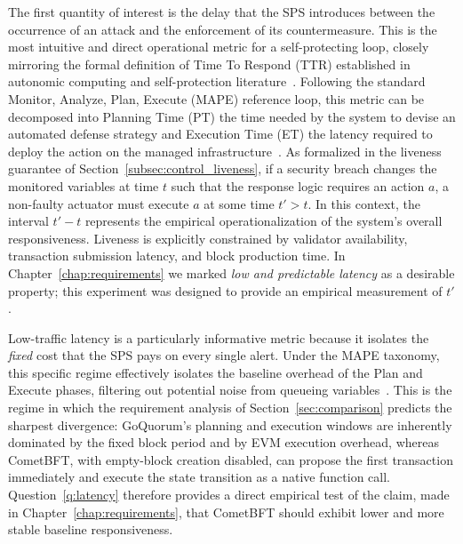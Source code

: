 The first quantity of interest is the delay that the SPS introduces between the occurrence of an attack and the enforcement of its countermeasure. This is the most intuitive and direct operational metric for a self-protecting loop, closely mirroring the formal definition of Time To Respond (TTR) established in autonomic computing and self-protection literature~\cite{montemaggio2020designing}. Following the standard Monitor, Analyze, Plan, Execute (MAPE) reference loop, this metric can be decomposed into Planning Time (PT) the time needed by the system to devise an automated defense strategy and Execution Time (ET) the latency required to deploy the action on the managed infrastructure~\cite{montemaggio2020designing}. As formalized in the liveness guarantee of Section~\ref{subsec:control_liveness}, if a security breach changes the monitored variables at time $t$ such that the response logic requires an action $a$, a non-faulty actuator must execute $a$ at some time $t' > t$. In this context, the interval $t' - t$ represents the empirical operationalization of the system's overall responsiveness. Liveness is explicitly constrained by validator availability, transaction submission latency, and block production time. In Chapter~\ref{chap:requirements} we marked \emph{low and predictable latency} as a desirable property; this experiment was designed to provide an empirical measurement of $t'$.

Low-traffic latency is a particularly informative metric because it isolates the \emph{fixed} cost that the SPS pays on every single alert. Under the MAPE taxonomy, this specific regime effectively isolates the baseline overhead of the Plan and Execute phases, filtering out potential noise from queueing variables~\cite{montemaggio2020designing}. This is the regime in which the requirement analysis of Section~\ref{sec:comparison} predicts the sharpest divergence: GoQuorum's planning and execution windows are inherently dominated by the fixed block period and by EVM execution overhead, whereas CometBFT, with empty-block creation disabled, can propose the first transaction immediately and execute the state transition as a native function call. Question~\ref{q:latency} therefore provides a direct empirical test of the claim, made in Chapter~\ref{chap:requirements}, that CometBFT should exhibit lower and more stable baseline responsiveness.

